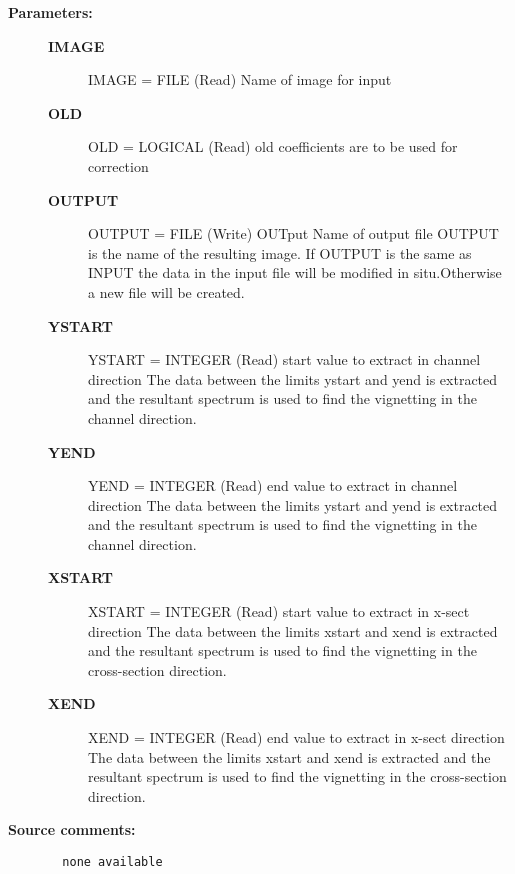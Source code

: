 \begin{description}
\item [{\bf Parameters:}]
\begin{description}
\item [{\bf IMAGE}]
    IMAGE = FILE (Read)
        Name of image for input
\item [{\bf OLD}]
    OLD = LOGICAL (Read)
        old coefficients are to be used for correction
\item [{\bf OUTPUT}]
    OUTPUT = FILE (Write)
        OUTput Name of output file
            OUTPUT is the name of the resulting image. If OUTPUT is the
            same as INPUT the data in the input file will be modified in
            situ.Otherwise a new file will be created.
\item [{\bf YSTART}]
    YSTART = INTEGER (Read)
        start value to extract in channel direction
            The data between the limits ystart and yend is extracted
            and the resultant spectrum is used to find the vignetting in
            the channel direction.
\item [{\bf YEND}]
    YEND = INTEGER (Read)
        end value to extract in channel direction
            The data between the limits ystart and yend is extracted
            and the resultant spectrum is used to find the vignetting in
            the channel direction.
\item [{\bf XSTART}]
    XSTART = INTEGER (Read)
        start value to extract in x-sect direction
            The data between the limits xstart and xend is extracted
            and the resultant spectrum is used to find the vignetting in
            the cross-section direction.
\item [{\bf XEND}]
    XEND = INTEGER (Read)
        end value to extract in x-sect direction
            The data between the limits xstart and xend is extracted
            and the resultant spectrum is used to find the vignetting in
            the cross-section direction.
\end{description}

\item [{\bf Source comments:}]
\begin{verbatim}
  none available

\end{verbatim}
\end{description}
